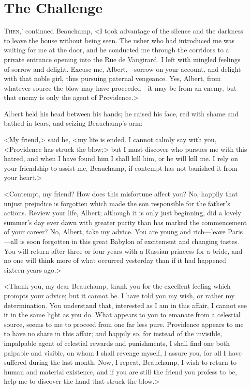 \chapter{The Challenge} 

 \lettrine[ante=`]{T}{hen},' continued Beauchamp, <I took advantage of the silence and the darkness to leave the house without being seen. The usher who had introduced me was waiting for me at the door, and he conducted me through the corridors to a private entrance opening into the Rue de Vaugirard. I left with mingled feelings of sorrow and delight. Excuse me, Albert,—sorrow on your account, and delight with that noble girl, thus pursuing paternal vengeance. Yes, Albert, from whatever source the blow may have proceeded—it may be from an enemy, but that enemy is only the agent of Providence.> 

 Albert held his head between his hands; he raised his face, red with shame and bathed in tears, and seizing Beauchamp's arm: 

 <My friend,> said he, <my life is ended. I cannot calmly say with you, <Providence has struck the blow;> but I must discover who pursues me with this hatred, and when I have found him I shall kill him, or he will kill me. I rely on your friendship to assist me, Beauchamp, if contempt has not banished it from your heart.> 

 <Contempt, my friend? How does this misfortune affect you? No, happily that unjust prejudice is forgotten which made the son responsible for the father's actions. Review your life, Albert; although it is only just beginning, did a lovely summer's day ever dawn with greater purity than has marked the commencement of your career? No, Albert, take my advice. You are young and rich—leave Paris—all is soon forgotten in this great Babylon of excitement and changing tastes. You will return after three or four years with a Russian princess for a bride, and no one will think more of what occurred yesterday than if it had happened sixteen years ago.> 

 <Thank you, my dear Beauchamp, thank you for the excellent feeling which prompts your advice; but it cannot be. I have told you my wish, or rather my determination. You understand that, interested as I am in this affair, I cannot see it in the same light as you do. What appears to you to emanate from a celestial source, seems to me to proceed from one far less pure. Providence appears to me to have no share in this affair; and happily so, for instead of the invisible, impalpable agent of celestial rewards and punishments, I shall find one both palpable and visible, on whom I shall revenge myself, I assure you, for all I have suffered during the last month. Now, I repeat, Beauchamp, I wish to return to human and material existence, and if you are still the friend you profess to be, help me to discover the hand that struck the blow.> 

